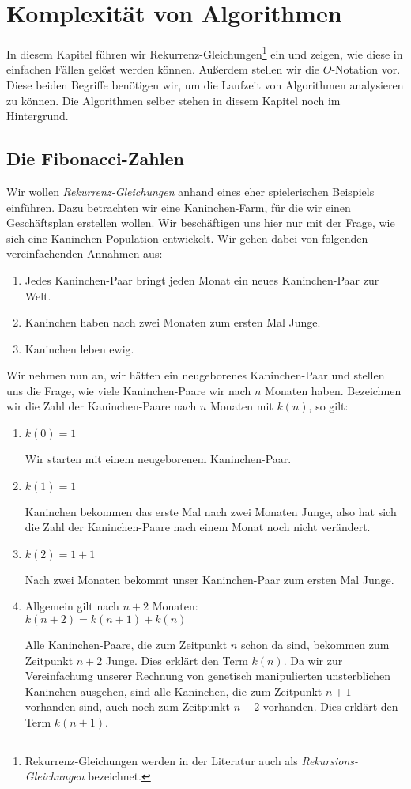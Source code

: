 \chapter{Komplexit\"at von Algorithmen} 
In diesem Kapitel f\"uhren wir 
Rekurrenz-Gleichungen\footnote{
Rekurrenz-Gleichungen werden in der Literatur auch als \emph{Rekursions-Gleichungen} bezeichnet.}
ein und zeigen, wie diese in einfachen F\"allen gel\"ost werden k\"onnen.  Au{\ss}erdem stellen wir
die $O$-Notation vor.  Diese beiden Begriffe ben\"otigen wir, um die Laufzeit von
Algorithmen analysieren zu k\"onnen.  Die Algorithmen selber stehen in diesem Kapitel noch
im Hintergrund.

\section{Die Fibonacci-Zahlen}
Wir wollen \emph{Rekurrenz-Gleichungen} anhand eines eher spielerischen Beispiels
einf\"uhren.  Dazu betrachten wir eine Kaninchen-Farm, f\"ur die wir einen Gesch\"aftsplan
erstellen wollen.   Wir besch\"aftigen uns hier nur mit der Frage, wie sich eine
Kaninchen-Population entwickelt.  Wir gehen dabei von folgenden vereinfachenden Annahmen aus:
\begin{enumerate}
\item Jedes Kaninchen-Paar bringt jeden Monat ein neues Kaninchen-Paar zur Welt.
\item Kaninchen haben nach zwei Monaten zum ersten Mal Junge.
\item Kaninchen leben ewig.
\end{enumerate}
Wir nehmen nun an, wir h\"atten ein neugeborenes Kaninchen-Paar und stellen uns die Frage, wie
viele Kaninchen-Paare wir nach $n$ Monaten haben.  Bezeichnen wir die Zahl der
Kaninchen-Paare nach $n$ Monaten mit $k(n)$, so gilt:
\begin{enumerate}
\item $k(0) = 1$

      Wir starten mit einem neugeborenem Kaninchen-Paar.
\item $k(1) = 1$

      Kaninchen bekommen das erste Mal nach zwei Monaten Junge, also hat sich die Zahl
      der Kaninchen-Paare nach einem Monat noch nicht ver\"andert.
\item $k(2) = 1 + 1$

      Nach zwei Monaten bekommt unser Kaninchen-Paar zum ersten Mal Junge.
\item Allgemein gilt nach $n + 2$ Monaten: \\[0.1cm]
      \hspace*{1.3cm} 
      $k(n+2) = k(n+1) + k(n)$

      Alle Kaninchen-Paare, die zum Zeitpunkt $n$ schon da sind, bekommen zum Zeitpunkt
      $n+2$ Junge. Dies erkl\"art den Term $k(n)$.  Da wir zur Vereinfachung unserer
      Rechnung von genetisch manipulierten unsterblichen Kaninchen ausgehen, sind alle
      Kaninchen, die zum Zeitpunkt $n+1$ vorhanden sind, auch noch zum Zeitpunkt $n+2$
      vorhanden. Dies erkl\"art den Term $k(n+1)$. 
\end{enumerate}
